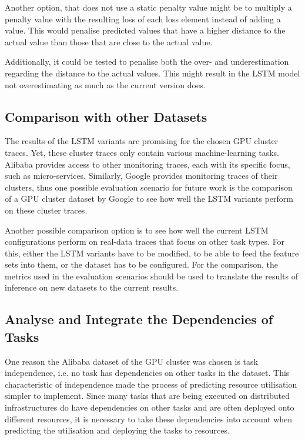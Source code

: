             Another option, that does not use a static penalty value might be to multiply a penalty value with the resulting loss of each loss element instead of adding a value. This would penalise predicted values that have a higher distance to the actual value than those that are close to the actual value.
            
            Additionally, it could be tested to penalise both the over- and underestimation regarding the distance to the actual values.
            This might result in the LSTM model not overestimating as much as the current version does.
        \subsection{Comparison with other Datasets}
        \label{sec:comparison-with-other-datasets-future-work}

            The results of the LSTM variants are promising for the chosen GPU cluster traces. 
            Yet, these cluster traces only contain various machine-learning tasks. 
            Alibaba provides access to other monitoring traces, each with its specific focus, such as micro-services.
            Similarly, Google provides monitoring traces of their clusters, thus one possible evaluation scenario for future work is the comparison of a GPU cluster dataset by Google to see how well the LSTM variants perform on these cluster traces.

            Another possible comparison option is to see how well the current LSTM configurations perform on real-data traces that focus on other task types. For this, either the LSTM variants have to be modified, to be able to feed the feature sets into them, or the dataset has to be configured. For the comparison, the metrics used in the evaluation scenarios should be used to translate the results of inference on new datasets to the current results.
            



        \subsection{Analyse and Integrate the Dependencies of Tasks}
        \label{sec:analyse-and-integrate-the-dependencies-of-tasks-future-work}

            One reason the Alibaba dataset of the GPU cluster was chosen is task independence, i.e. no task has dependencies on other tasks in the dataset.
            This characteristic of independence made the process of predicting resource utilisation simpler to implement.
            Since many tasks that are being executed on distributed infrastructures do have dependencies on other tasks and are often deployed onto different resources, it is necessary to take these dependencies into account when predicting the utilisation and deploying the tasks to resources.

